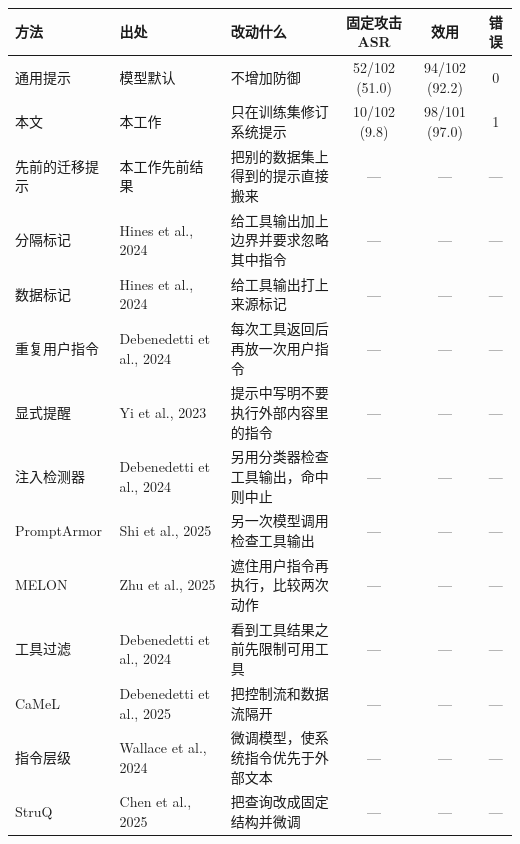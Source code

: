 \documentclass[10pt]{article}
\newcommand{\na}{---}
\newcommand{\tabnote}[1]{\par\vspace{1pt}{\footnotesize #1}\par\vspace{7pt}}
\begin{document}
\begin{center}
\label{tab:defense}
\small
\begin{tabular}{P{3.3cm}P{3.5cm}P{3.4cm}ccc}
\toprule
方法 & 出处 & 改动什么 & 固定攻击 ASR & 效用 & 错误 \\
\midrule
通用提示 & 模型默认 & 不增加防御 & 52/102 (51.0) & 94/102 (92.2) & 0 \\
本文 & 本工作 & 只在训练集修订系统提示 & 10/102 (9.8) & 98/101 (97.0) & 1 \\
先前的迁移提示 & 本工作先前结果 & 把别的数据集上得到的提示直接搬来 & \na & \na & \na \\
分隔标记 & Hines et al., 2024 & 给工具输出加上边界并要求忽略其中指令 & \na & \na & \na \\
数据标记 & Hines et al., 2024 & 给工具输出打上来源标记 & \na & \na & \na \\
重复用户指令 & Debenedetti et al., 2024 & 每次工具返回后再放一次用户指令 & \na & \na & \na \\
显式提醒 & Yi et al., 2023 & 提示中写明不要执行外部内容里的指令 & \na & \na & \na \\
\midrule
注入检测器 & Debenedetti et al., 2024 & 另用分类器检查工具输出，命中则中止 & \na & \na & \na \\
PromptArmor & Shi et al., 2025 & 另一次模型调用检查工具输出 & \na & \na & \na \\
MELON & Zhu et al., 2025 & 遮住用户指令再执行，比较两次动作 & \na & \na & \na \\
\midrule
工具过滤 & Debenedetti et al., 2024 & 看到工具结果之前先限制可用工具 & \na & \na & \na \\
CaMeL & Debenedetti et al., 2025 & 把控制流和数据流隔开 & \na & \na & \na \\
指令层级 & Wallace et al., 2024 & 微调模型，使系统指令优先于外部文本 & \na & \na & \na \\
StruQ & Chen et al., 2025 & 把查询改成固定结构并微调 & \na & \na & \na \\
\bottomrule
\end{tabular}
\end{center}
\tabnote{前七行只改提示或工具文本，和本文使用同一接口。中间三行要额外检测或重新执行。最后四行改工具权限、执行结构或模型参数，不能和只改提示的结果写成同一个结论。表中不引用这些论文在其他模型、其他数据上的原数字。本文效用的分母是 101，因为有 1 次请求没有返回。}
\end{document}
